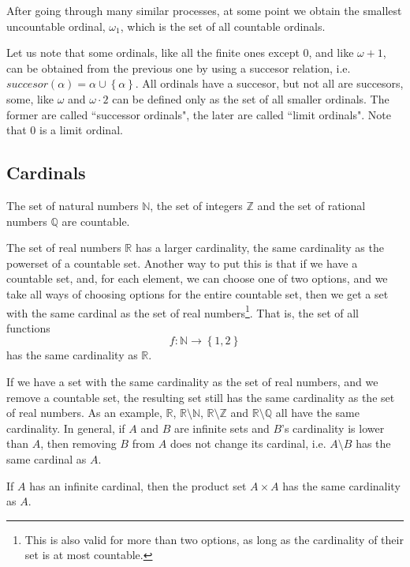 \documentclass[a4paper
,draft
]{article}
\def\reale{\mathbb{R}}
\def\intregi{\mathbb{Z}}
\def\naturale{\mathbb{N}}
\def\rationale{\mathbb{Q}}
\newcommand{\multime}[1]{\left\{ #1 \right\}}
\newcommand{\ghilimele}[1]{``#1"}
\begin{document}
After going through many similar processes, at some point we obtain the
smallest uncountable ordinal, $\omega_1$, which is the set of all
countable ordinals.

Let us note that some ordinals, like all the finite ones except $0$,
and like $\omega+1$, can be obtained from the previous one by using
a succesor relation, i.e. $succesor(\alpha) = \alpha\cup\multime{\alpha}$.
All ordinals have a succesor, but not all are succesors, some, like
$\omega$ and $\omega\cdot 2$ can be defined only as the set of all
smaller ordinals. The former are called \ghilimele{successor ordinals},
the later are called \ghilimele{limit ordinals}. Note that $0$ is a limit
ordinal.

\subsection{Cardinals}
\label{sec:cardinals}

The set of natural numbers $\naturale$, the set of integers $\intregi$ and
the set of rational numbers $\rationale$ are countable.

The set of real numbers $\reale$ has a larger cardinality, the same cardinality
as the powerset of a countable set. Another way to put this is that
if we have a countable set, and, for each element, we can choose one of two
options,
and we take all ways of choosing options for the entire countable set,
then we get a set with the same cardinal as the set of real numbers\footnote{
    This is also valid for more than two options, as long as the cardinality
    of their set is at most countable.
  }.
That is, the set of all functions
$$
f : \naturale \longrightarrow \multime{1, 2}
$$
has the same cardinality as $\reale$.

If we have a set with the same cardinality as the set of real numbers, and
we remove a countable set, the resulting set still has the same cardinality
as the set of real numbers. As an example, $\reale$, $\reale\setminus\naturale$,
$\reale\setminus\intregi$ and $\reale\setminus\rationale$ all have the same
cardinality. In general, if $A$ and $B$ are infinite sets and
$B$'s cardinality is lower than $A$, then removing $B$ from $A$ does not change
its cardinal, i.e. $A\setminus B$ has the same cardinal as $A$.

If $A$ has an infinite cardinal, then the product set $A\times A$ has the same
cardinality as $A$.

\printbibliography
\end{document}
